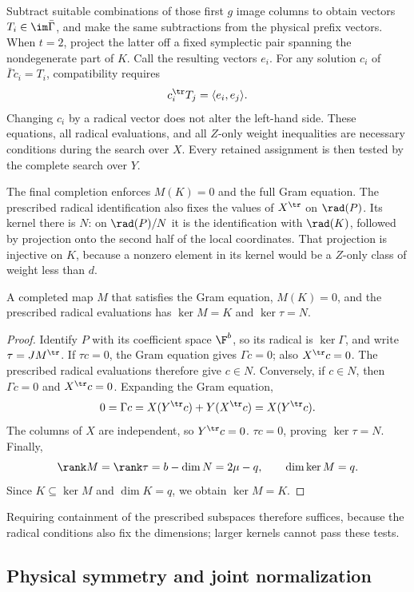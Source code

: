 Subtract suitable combinations of those first \(g\) image columns
to obtain vectors \(T_i\in\im\bar\Gamma\), and make the same
subtractions from the physical prefix vectors. When \(t=2\), project
the latter off a fixed symplectic pair spanning the nondegenerate
part of \(K\). Call the resulting vectors \(e_i\).
For any solution \(c_i\) of \(\bar\Gamma c_i=T_i\), compatibility
requires
\[
 c_i^\tr T_j=\langle e_i,e_j\rangle.
\]
Changing \(c_i\) by a radical vector does not alter the left-hand
side. These equations, all radical evaluations, and all \(Z\)-only
weight inequalities are necessary conditions during the search over
\(X\). Every retained assignment is then tested by the complete search
over \(Y\).

The final completion enforces \(M(K)=0\) and the full Gram equation.
The prescribed radical identification also fixes the values of
\(X^\tr\) on \(\rad(P)\). Its kernel there is \(N\):
on \(\rad(P)/N\) it is the identification with \(\rad(K)\),
followed by projection onto the second half of the local coordinates.
That projection is injective on \(K\), because a nonzero element in
its kernel would be a \(Z\)-only class of weight less than \(d\).

\begin{lemma}\label{lem:fixedkernel}
A completed map \(M\) that satisfies the Gram equation, \(M(K)=0\), and
the prescribed radical evaluations has \(\ker M=K\) and \(\ker\tau=N\).
\end{lemma}
\begin{proof}
Identify \(P\) with its coefficient space \(\F^b\), so its radical
is \(\ker\Gamma\), and write \(\tau=JM^\tr\).
If \(\tau c=0\), the Gram equation gives \(\Gamma c=0\);
also \(X^\tr c=0\). The prescribed radical evaluations therefore
give \(c\in N\). Conversely, if \(c\in N\), then
\(\Gamma c=0\) and \(X^\tr c=0\). Expanding the Gram equation,
\[
 0=\Gamma c=X(Y^\tr c)+Y(X^\tr c)=X(Y^\tr c).
\]
The columns of \(X\) are independent, so \(Y^\tr c=0\).
\(\tau c=0\), proving \(\ker\tau=N\). Finally,
\[
 \rank M=\rank\tau=b-\dim N=2\mu-q,
 \qquad \dim\ker M=q.
\]
Since \(K\subseteq\ker M\) and \(\dim K=q\), we obtain
\(\ker M=K\).
\end{proof}
Requiring containment of the prescribed subspaces therefore suffices,
because the radical conditions also fix the dimensions; larger kernels
cannot pass these tests.

\subsection{Physical symmetry and joint normalization}\label{sec:symmetry}

